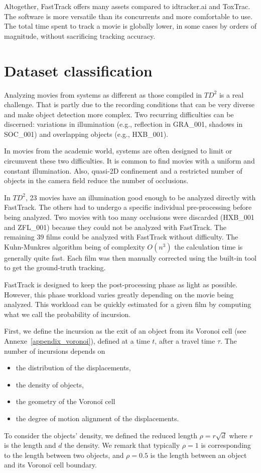     Altogether, FastTrack offers many assets compared to idtracker.ai and ToxTrac. The software is more versatile than its concurrents and more comfortable to use. The total time spent to track a movie is globally lower, in some cases by orders of magnitude, without sacrificing tracking accuracy.

	\section{Dataset classification}
    Analyzing movies from systems as different as those compiled in $TD^2$ is a real challenge. That is partly due to the recording conditions that can be very diverse and make object detection more complex. Two recurring difficulties can be discerned: variations in illumination (e.g., reflection in GRA\_001, shadows in SOC\_001) and overlapping objects (e.g., HXB\_001).

    In movies from the academic world, systems are often designed to limit or circumvent these two difficulties. It is common to find movies with a uniform and constant illumination. Also, quasi-2D confinement and a restricted number of objects in the camera field reduce the number of occlusions.

    In $TD^2$, 23 movies have an illumination good enough to be analyzed directly with FastTrack. The others had to undergo a specific individual pre-processing before being analyzed. Two movies with too many occlusions were discarded (HXB\_001 and ZFL\_001) because they could not be analyzed with FastTrack.
    The remaining 39 films could be analyzed with FastTrack without difficulty. The Kuhn-Munkres algorithm being of complexity $O(n^3)$ the calculation time is generally quite fast. Each film was then manually corrected using the built-in tool to get the ground-truth tracking.

    FastTrack is designed to keep the post-processing phase as light as possible. However, this phase workload varies greatly depending on the movie being analyzed. This workload can be quickly estimated for a given film by computing what we call the probability of incursion.

    First, we define the incursion as the exit of an object from its Voronoi cell (see Annexe~\ref{appendix_voronoi}), defined at a time $t$, after a travel time $\tau$. The number of incursions depends on
    \begin{itemize}
    \item the distribution of the displacements,
    \item the density of objects,
    \item the geometry of the Voronoï cell
    \item the degree of motion alignment of the displacements.
    \end{itemize}
    To consider the objects' density, we defined the reduced length $\rho=r\sqrt{d}$ where $r$ is the length and $d$ the density. We remark that typically $\rho=1$ is corresponding to the length between two objects, and $\rho=0.5$ is the length between an object and its Voronoï cell boundary.

